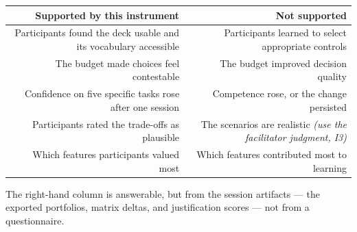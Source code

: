 \documentclass[11pt,letterpaper]{article}
\begin{document}
\begin{center}
\small
\begin{tabularx}{\textwidth}{@{}R R@{}}
\toprule
\textbf{Supported by this instrument} & \textbf{Not supported} \\
\midrule
Participants found the deck usable and its vocabulary accessible &
Participants learned to select appropriate controls \\
The budget made choices feel contestable &
The budget improved decision quality \\
Confidence on five specific tasks rose after one session &
Competence rose, or the change persisted \\
Participants rated the trade-offs as plausible &
The scenarios are realistic \emph{(use the facilitator judgment, I3)} \\
Which features participants valued most &
Which features contributed most to learning \\
\bottomrule
\end{tabularx}
\end{center}

The right-hand column is answerable, but from the session artifacts --- the
exported portfolios, matrix deltas, and justification scores --- not from a
questionnaire.
\end{document}
